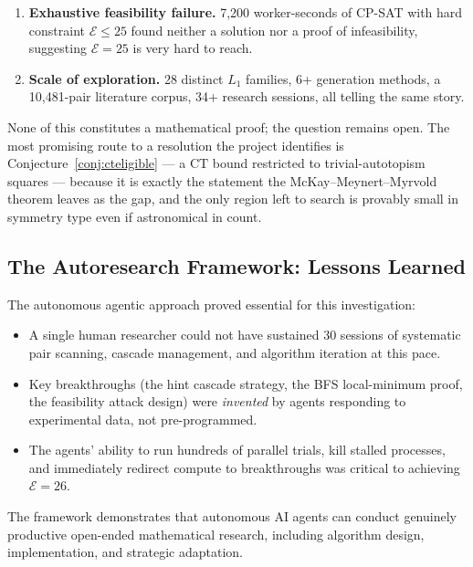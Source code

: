 \documentclass[11pt,a4paper]{article}
\theoremstyle{remark}
\newcommand{\CT}{\mathrm{CT}}
\newcommand{\E}{\mathcal{E}}
\begin{document}
\begin{enumerate}
    the prior record pair \texttt{iso\_tv\_21\_0} stalls at $\E=26$ (with feasibility attack
    evidence); the new record pair \texttt{tv\_254} reaches $\E=23$ but resists further
    improvement via IC-only methods. Non-IC escape SA is ongoing.
  \item \textbf{Exhaustive feasibility failure.} 7,200 worker-seconds of CP-SAT
    with hard constraint $\E \leq 25$ found neither a solution nor a proof of
    infeasibility, suggesting $\E=25$ is very hard to reach.
  \item \textbf{Scale of exploration.} 28 distinct $L_1$ families, 6+ generation
    methods, a 10{,}481-pair literature corpus, 34+ research sessions, all
    telling the same story.
\end{enumerate}

None of this constitutes a mathematical proof; the question remains open.
The most promising route to a resolution the project identifies is
Conjecture~\ref{conj:cteligible} --- a $\CT$ bound restricted to
trivial-autotopism squares --- because it is exactly the statement the
McKay--Meynert--Myrvold theorem leaves as the gap, and the only region left
to search is provably small in symmetry type even if astronomical in count.

\subsection{The Autoresearch Framework: Lessons Learned}

The autonomous agentic approach proved essential for this investigation:
\begin{itemize}
  \item A single human researcher could not have sustained 30 sessions of systematic
    pair scanning, cascade management, and algorithm iteration at this pace.
  \item Key breakthroughs (the hint cascade strategy, the BFS local-minimum proof,
    the feasibility attack design) were \emph{invented} by agents responding to
    experimental data, not pre-programmed.
  \item The agents' ability to run hundreds of parallel trials, kill stalled processes,
    and immediately redirect compute to breakthroughs was critical to achieving $\E=26$.
\end{itemize}

The framework demonstrates that autonomous AI agents can conduct genuinely productive
open-ended mathematical research, including algorithm design, implementation, and
strategic adaptation.
\end{document}

